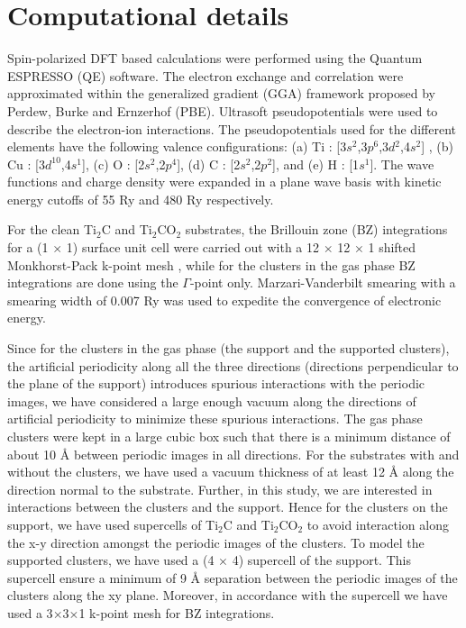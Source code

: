 \section{Computational details }
   \label{compdett}
Spin-polarized DFT based calculations were performed using the Quantum ESPRESSO (QE) 
software\cite{QE2009}. The electron exchange and correlation were approximated within the 
generalized gradient (GGA) framework proposed by Perdew, Burke and Ernzerhof 
(PBE)\cite{GGA-PBE1996}. Ultrasoft pseudopotentials\cite{USPP1990} were used to describe the 
electron-ion interactions. The pseudopotentials used for the different elements have the following 
valence configurations: (a) Ti : [3$s{^2}$,3$p{^6}$,3$d{^2}$,4$s{^2}$] , (b) Cu : 
[3$d^{10}$,4$s{^1}$], (c) O : [2$s{^2}$,2$p{^4}$], (d) C : [2$s{^2}$,2$p{^2}$], and (e) H : 
[1$s^1$]. The wave functions and charge density were expanded in a plane wave basis with kinetic 
energy cutoffs of 55 Ry and 480 Ry respectively. 
 
For the clean Ti$_2$C and Ti$_2$CO$_2$ substrates, the Brillouin zone (BZ) integrations for a (1 
$\times$ 1) surface unit cell were carried out with a 12 $\times$ 12 $\times$ 1 shifted 
Monkhorst-Pack k-point mesh \cite{K-pointMP1976}, while for the clusters in the gas phase BZ 
integrations are done using the $\Gamma$-point only. Marzari-Vanderbilt smearing 
\cite{SmearingMV1999} with a smearing width of 0.007 Ry was used to expedite the convergence of electronic 
energy. 

Since for the clusters in the gas phase (the support and 
the supported clusters), the artificial periodicity along all 
the three directions (directions perpendicular to the plane of the support) introduces spurious interactions with the
periodic images, we have considered a large enough vacuum along the directions of artificial periodicity to minimize these spurious interactions. The gas phase clusters were kept in a large cubic box such that there is a minimum distance of about  10 {\AA} between periodic images in all directions. For the substrates with and without the clusters, we have used a vacuum thickness of at least 12 {\AA} along the direction normal to the substrate. Further, in this study, we are interested in interactions between the clusters and
the support. Hence for the clusters on the support, we have used supercells of Ti$_2$C and Ti$_2$CO$_2$ to avoid interaction along the x-y direction amongst the periodic images of the clusters. To model the supported clusters, we have used a (4 $\times$ 4) supercell of the support. This supercell ensure a minimum of 9 {\AA} separation between the periodic images of the clusters along the xy plane. Moreover, in accordance with the supercell we have used a 3$\times$3$\times$1 k-point mesh for BZ integrations. 



